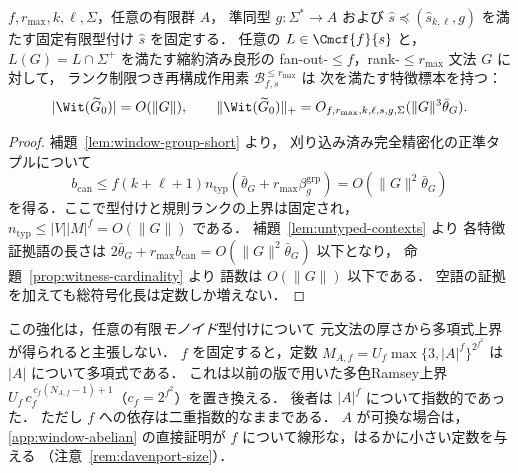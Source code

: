 \begin{theorem}[窓と任意有限群による型付けの多項式特徴データ]
\label{thm:window-group-polydata}
$f,r_{\max},k,\ell,\Sigma$，任意の有限群 $A$，
準同型 $g:\Sigma^*\to A$ および
$\widehat{s}\preceq(\widehat{s}_{k,\ell},g)$ を満たす固定有限型付け
$\widehat{s}$ を固定する．
任意の $L\in\Cmcf{f}{s}$ と，
$L(G)=L\cap\Sigma^+$ を満たす縮約済み良形の
fan-out-$\le f$，rank-$\le r_{\max}$ 文法 $G$ に対して，
ランク制限つき再構成作用素
$\mathcal B^{\le r_{\max}}_{f,s}$ は
次を満たす特徴標本を持つ：
\[
 |\Wit(\widetilde G_0)|=O(\|G\|),\qquad
 \|\Wit(\widetilde G_0)\|_+
 =O_{f,r_{\max},k,\ell,s,g,\Sigma}
   (\|G\|^3\bar\theta_G).
\]
\end{theorem}
\begin{proof}
補題~\ref{lem:window-group-short} より，
刈り込み済み完全精密化の正準タプルについて
\[
 b_{\mathrm{can}}\le
 f(k+\ell+1)n_{\mathrm{typ}}
 (\bar\theta_G+r_{\max}\beta_g^{\mathrm{grp}})
 =O(\|G\|^2\bar\theta_G)
\]
を得る．ここで型付けと規則ランクの上界は固定され，
$n_{\mathrm{typ}}\le|V||M|^f=O(\|G\|)$ である．
補題~\ref{lem:untyped-contexts} より
各特徴証拠語の長さは
$2\bar\theta_G+r_{\max}b_{\mathrm{can}}
=O(\|G\|^2\bar\theta_G)$ 以下となり，
命題~\ref{prop:witness-cardinality} より
語数は $O(\|G\|)$ 以下である．
空語の証拠を加えても総符号化長は定数しか増えない．
\end{proof}

\begin{remark}
この強化は，任意の有限\emph{モノイド}型付けについて
元文法の厚さから多項式上界が得られると主張しない．
$f$ を固定すると，定数
$M_{A,f}=U_f\max\{3,|A|^f\}^{2^{f^2}}$ は $|A|$ について多項式である．
これは以前の版で用いた多色Ramsey上界
$U_f\,c_f^{\,c_f(N_{A,f}-1)+1}$（$c_f=2^{f^2}$）を置き換える．
後者は $|A|^f$ について指数的であった．
ただし $f$ への依存は二重指数的なままである．
$A$ が可換な場合は，\ref{app:window-abelian} の直接証明が
$f$ について線形な，はるかに小さい定数を与える
（注意~\ref{rem:davenport-size}）．
\end{remark}

